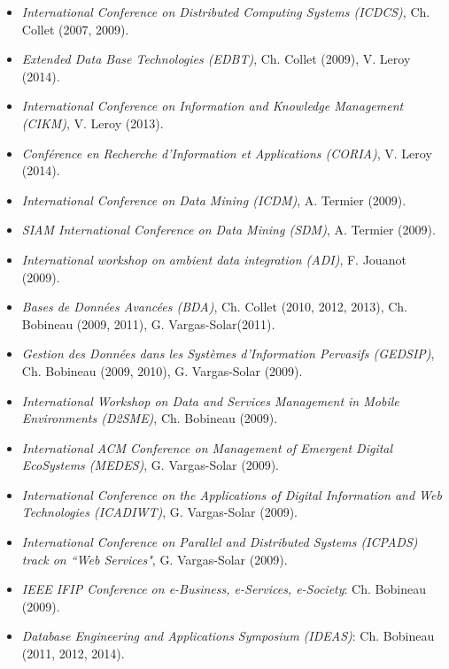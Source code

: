 \begin{itemize}
\setlength{\itemindent}{-0.5cm}
\setlength{\itemsep}{-0.1cm}

\item {\it International Conference on Distributed Computing Systems (ICDCS)}, Ch. Collet (2007, 2009).

\item {\it Extended Data Base Technologies (EDBT)}, Ch. Collet (2009), V. Leroy (2014).

\item {\it International Conference on Information and Knowledge Management (CIKM)}, V. Leroy (2013).

\item {\it Conférence en Recherche d'Information et Applications (CORIA)}, V. Leroy (2014).

\item {\it International Conference on Data Mining (ICDM)}, A. Termier (2009).

\item {\it SIAM International Conference on Data Mining (SDM)}, A. Termier (2009).

\item {\it International workshop on ambient data integration (ADI)}, F. Jouanot (2009).

\item {\it Bases de Donn{\'e}es Avanc{\'e}es (BDA)}, Ch. Collet (2010, 2012, 2013), Ch. Bobineau (2009, 2011), G. Vargas-Solar(2011).

\item {\it Gestion des Donn{\'e}es dans les Syst{\`e}mes d'Information Pervasifs (GEDSIP)}, Ch. Bobineau (2009, 2010), G. Vargas-Solar (2009).

\item {\it International Workshop on Data and Services Management in Mobile Environments (D2SME)}, Ch. Bobineau (2009).

\item {\it International ACM Conference on Management of Emergent Digital EcoSystems (MEDES)}, G. Vargas-Solar (2009).

\item {\it International Conference on the Applications of Digital Information and Web Technologies (ICADIWT)}, G. Vargas-Solar (2009).

\item {\it International Conference on Parallel and Distributed Systems (ICPADS) track on ``Web Services"}, G. Vargas-Solar (2009).

\item {\it IEEE IFIP Conference on e-Business, e-Services, e-Society}: Ch. Bobineau (2009).

\item {\it Database Engineering and Applications Symposium (IDEAS)}: Ch. Bobineau (2011, 2012, 2014).

\end{itemize}

